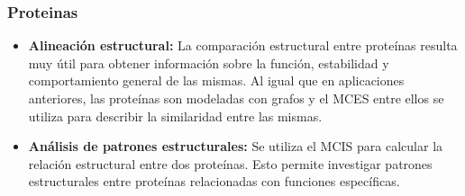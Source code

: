 \subsubsection{Proteinas}

\begin{itemize}
\item \textbf{Alineación estructural:}
La comparación estructural entre proteínas resulta muy útil para obtener información sobre la función, estabilidad y comportamiento general de las mismas. Al igual que en aplicaciones anteriores, las proteínas son modeladas con grafos y el MCES entre ellos se utiliza para describir la similaridad entre las mismas.

\item \textbf{Análisis de patrones estructurales:}
Se utiliza el MCIS para calcular la relación estructural entre dos proteínas. Esto permite investigar patrones estructurales entre proteínas relacionadas con funciones específicas.

\end{itemize}





